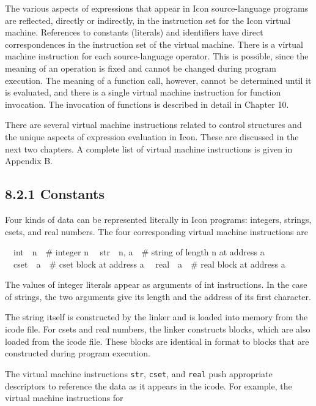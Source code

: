 The various aspects of expressions that appear in Icon source-language
programs are reflected, directly or indirectly, in the instruction set
for the Icon virtual machine. References to constants (literals) and
identifiers have direct correspondences in the instruction set of the
virtual machine. There is a virtual machine instruction for each
source-language operator. This is possible, since the meaning of an
operation is fixed and cannot be changed during program execution. The
meaning of a function call, however, cannot be determined until it is
evaluated, and there is a single virtual machine instruction for
function invocation. The invocation of functions is described in
detail in Chapter 10.

There are several virtual machine instructions related to control
structures and the unique aspects of expression evaluation in
Icon. These are discussed in the next two chapters. A complete list of
virtual machine instructions is given in Appendix B.

\subsection[8.2.1 Constants]{8.2.1 Constants}

Four kinds of data can be represented literally in Icon programs:
integers, strings, csets, and real numbers. The four corresponding
virtual machine instructions are

{\ttfamily\mdseries
\ \ int\ \ n\ \ \# integer n\newline
\ \ str\ \ n, a\ \ \# string of length n at address a\newline
\ \ cset\ \ a\ \ \# cset block at address a\newline
\ \ real\ \ a\ \ \# real block at address a}

The values of integer literals appear as arguments of int
instructions. In the case of strings, the two arguments give its
length and the address of its first character.

The string itself is constructed by the linker and is loaded into
memory from the icode file. For csets and real numbers, the linker
constructs blocks, which are also loaded from the icode file. These
blocks are identical in format to blocks that are constructed during
program execution.

The virtual machine instructions \texttt{str}, \texttt{cset}, and
\texttt{real} push appropriate descriptors to reference the data as it
appears in the icode. For example, the virtual machine instructions
for

